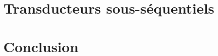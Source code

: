 \documentclass{beamer}
\begin{document}
		\begin{frame}
			
		\end{frame}
		
		\begin{frame}
			
		\end{frame}
		
		\begin{frame}
			
		\end{frame}
		
		\begin{frame}
			
		\end{frame}
		
		\begin{frame}
			
		\end{frame}
		
		\begin{frame}
			
		\end{frame}
		
		\begin{frame}
			
		\end{frame}
		
	\section{Transducteurs sous-séquentiels}
	
		\begin{frame}
			
		\end{frame}
		
		\begin{frame}
			
		\end{frame}
		
		\begin{frame}
			
		\end{frame}
		
		\begin{frame}
			
		\end{frame}
		
		\begin{frame}
			
		\end{frame}
	
	\section{Conclusion}
	
		\begin{frame}
			
		\end{frame}
		
		\begin{frame}
			
		\end{frame}
\end{document}
